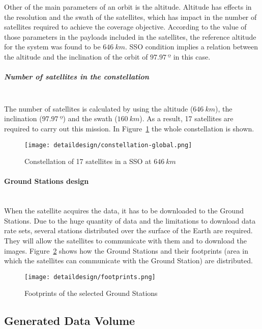 Other of the main parameters of an orbit is the altitude. Altitude has effects
in the resolution and the swath of the satellites, which has impact in the
number of satellites required to achieve the coverage objective. According to
the value of those parameters in the payloads included in the satellites, the
reference altitude for the system was found to be $646~km$. \ac{SSO}
condition implies a relation between the altitude and the inclination of the
orbit of $97.97~º$ in this case.

\subparagraph{Number of satellites in the constellation}~\\
The number of satellites is calculated by using the altitude ($646~km$), the
inclination ($97.97~º$) and the swath ($160~km$). As a result, 17 satellites are
required to carry out this mission. In Figure~\ref{fig:intr-constellation-global} the whole constellation is
shown.

\begin{figure}[!h]
\begin{center}
\texttt{[image: detaildesign/constellation-global.png]}
\caption{Constellation of 17 satellites in a SSO at $646~km$}
\label{fig:intr-constellation-global}
\end{center}
\end{figure}

\paragraph{Ground Stations design}~\\
When the satellite acquires the data, it has to be downloaded to the Ground
Stations. Due to the huge
quantity of data and the limitations to download data rate sets, several
stations distributed over the surface of the Earth are required. They will allow
the satellites to communicate with them and to download the
images. Figure~\ref{fig:intr-footprints} shows how the Ground Stations and their
footprints (area in which the satellites can communicate with the Ground
Station) are distributed.


\begin{figure}[!h]
\begin{center}
\texttt{[image: detaildesign/footprints.png]}
\caption{Footprints of the selected Ground Stations}
\label{fig:intr-footprints}
\end{center}
\end{figure}

\subsection{Generated Data Volume}

